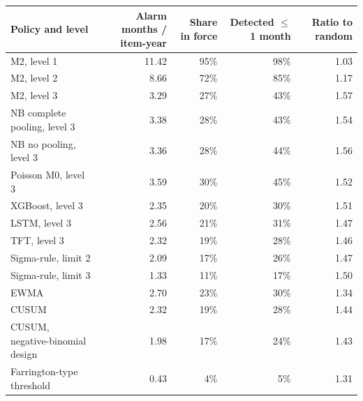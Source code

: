 \noindent\begin{minipage}{\linewidth}
\label{tab:S21_3}
\centering\footnotesize
\begin{tabular}{lrrrr}
\toprule
Policy and level & Alarm months / item-year & Share in force & Detected $\le$ 1 month & Ratio to random \\ \midrule
M2, level 1 & 11.42 & 95\% & 98\% & 1.03 \\
M2, level 2 & 8.66 & 72\% & 85\% & 1.17 \\
M2, level 3 & 3.29 & 27\% & 43\% & 1.57 \\
NB complete pooling, level 3 & 3.38 & 28\% & 43\% & 1.54 \\
NB no pooling, level 3 & 3.36 & 28\% & 44\% & 1.56 \\
Poisson M0, level 3 & 3.59 & 30\% & 45\% & 1.52 \\
XGBoost, level 3 & 2.35 & 20\% & 30\% & 1.51 \\
LSTM, level 3 & 2.56 & 21\% & 31\% & 1.47 \\
TFT, level 3 & 2.32 & 19\% & 28\% & 1.46 \\
Sigma-rule, limit 2 & 2.09 & 17\% & 26\% & 1.47 \\
Sigma-rule, limit 3 & 1.33 & 11\% & 17\% & 1.50 \\
EWMA & 2.70 & 23\% & 30\% & 1.34 \\
CUSUM & 2.32 & 19\% & 28\% & 1.44 \\
CUSUM, negative-binomial design & 1.98 & 17\% & 24\% & 1.43 \\
Farrington-type threshold & 0.43 & 4\% & 5\% & 1.31 \\
\bottomrule
\end{tabular}
\end{minipage}
\vspace{14pt}

